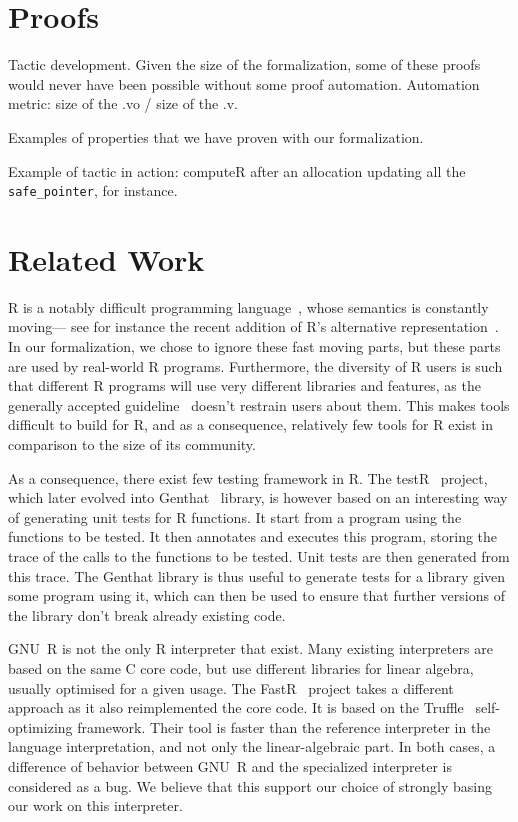 \documentclass[
    sigplan,
    10pt,
    review, %
    natbib=false %
 ]{acmart}
\begin{document}
\section{Proofs}
\label{sec:proofs}

Tactic development.
Given the size of the formalization, some of these proofs would never have been possible
without some proof automation.
Automation metric: size of the .vo / size of the .v.

Examples of properties that we have proven with our formalization.

Example of tactic in action:
computeR after an allocation updating all the \texttt{safe_pointer}, for instance.

\section{Related Work}
\label{sec:related:work}

R is a notably difficult programming language~\parencite{RInferno},
whose semantics is constantly moving—%
see for instance the recent addition
of R’s alternative representation~\parencite{altrepR}.
In our formalization, we chose to ignore these fast moving parts,
but these parts are used by real-world R programs.
Furthermore, the diversity of R users is such that different R programs
will use very different libraries and features,
as the generally accepted guideline~\parencite{RGuidelines}
doesn’t restrain users about them.
This makes tools difficult to build for R,
and as a consequence, relatively few tools for R exist
in comparison to the size of its community.

As a consequence,
there exist few testing framework in R.
The testR~\parencite{maj2013testr, 2014testr} project,
which later evolved into Genthat~\parencite{genthat} library,
is however based on an interesting way of generating unit tests for R functions.
It start from a program using the functions to be tested.
It then annotates and executes this program,
storing the trace of the calls to the functions to be tested.
Unit tests are then generated from this trace.
The Genthat library is thus useful to generate tests for a library
given some program using it,
which can then be used to ensure that further versions of the library
don’t break already existing code.

GNU~R is not the only R interpreter that exist.
Many existing interpreters are based on the same C core code,
but use different libraries for linear algebra,
usually optimised for a given usage.
%
The FastR~\parencite{kalibera2014fast} project takes a different approach
as it also reimplemented the core code.
It is based on the Truffle~\parencite{wuerthingertruffle}
self-optimizing framework.
Their tool is faster than the reference interpreter
in the language interpretation, and not only the linear-algebraic part.
%
In both cases, a difference of behavior between GNU~R
and the specialized interpreter is considered as a bug.
We believe that this support our choice of strongly basing
our work on this interpreter.
\end{document}
